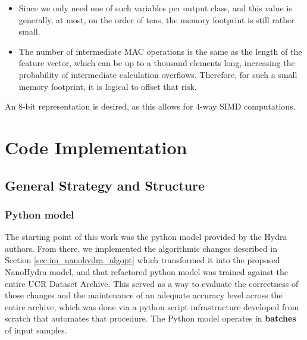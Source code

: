         \begin{itemize}
            \item Since we only need one of such variables per output class, and this value is generally, at most, on the order of tens, the memory footprint is still rather small. 
            \item The number of intermediate MAC operations is the same as the length of the feature vector, which can be up to a thousand elements long, increasing the probability of intermediate calculation
                  overflows. Therefore, for such a small memory footprint, it is logical to offset that risk.
        \end{itemize}

        An 8-bit representation is desired, as this allows for 4-way SIMD computations.

\section{Code Implementation}\label{sec:im_nanohydra_codeimp}

    \subsection{General Strategy and Structure}\label{sec:im_nanohydra_genstrat}

    \subsubsection{Python model}
    The starting point of this work was the python model provided by the Hydra authors. From there, we implemented the algorithmic changes described in Section \ref{sec:im_nanohydra_algopt}
    which transformed it into the proposed NanoHydra model, and that refactored python model was trained against the entire UCR Dataset Archive. This served as a way to evaluate the correctness of those changes 
    and the maintenance of an adequate accuracy level across the entire archive, which was done via a python script infrastructure developed from scratch
    that automates that procedure. The Python model operates in \textbf{batches} of input samples.

